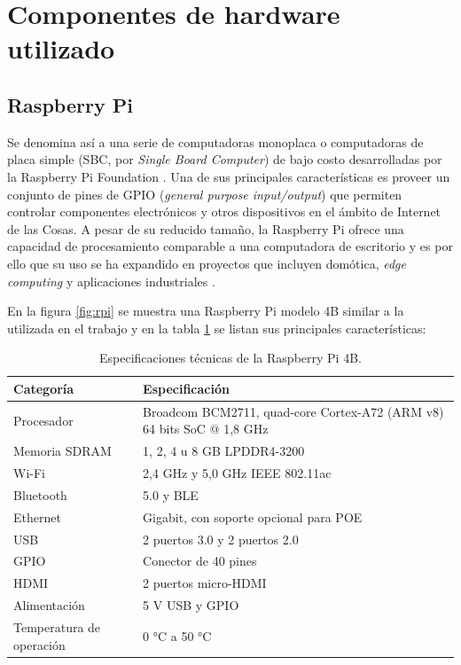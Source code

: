 \section{Componentes de hardware utilizado}
\label{sec:Hardware utilizado}

\subsection{Raspberry Pi}
\label{sec:Raspberry Pi}
Se denomina así a una serie de computadoras monoplaca o computadoras de placa simple (SBC, por \textit{Single Board Computer}) de bajo costo desarrolladas por la Raspberry Pi Foundation \citep{raspberrypi:1}.
Una de sus principales características es proveer un conjunto de pines de GPIO (\textit{general purpose input/output}) que permiten controlar componentes electrónicos y otros dispositivos en el ámbito de Internet de las Cosas.
A pesar de su reducido tamaño, la Raspberry Pi ofrece una capacidad de procesamiento comparable a una computadora de escritorio y es por ello que su uso se ha expandido en proyectos que incluyen domótica, \textit{edge computing} y aplicaciones industriales \citep{raspberrypi:2}. 

En la figura \ref{fig:rpi} se muestra una Raspberry Pi modelo 4B similar a la utilizada en el trabajo y en la tabla \ref{tab:raspberrypi} se listan sus principales características: 
 
\begin{table}[h]
\centering
\caption[Especificaciones técnicas de la Raspberry Pi 4B]{Especificaciones técnicas de la Raspberry Pi 4B.}

\begin{tabular}{p{2.5cm} p{7.5cm} } 
\toprule
\textbf{Categoría} & \textbf{Especificación}\citep{rpi4b}\\

\midrule
Procesador	& Broadcom BCM2711, quad-core Cortex-A72 (ARM v8) 64 bits SoC @ 1,8 GHz \\
Memoria SDRAM	 & 1, 2, 4 u 8 GB LPDDR4-3200 \\
Wi-Fi	& 2,4 GHz y 5,0 GHz IEEE 802.11ac \\
Bluetooth	&  5.0 y BLE \\
Ethernet	& Gigabit, con soporte opcional para POE\\
USB	& 2 puertos  3.0 y 2 puertos 2.0\\
GPIO	&	Conector de 40 pines\\
HDMI	&  2 puertos micro-HDMI\\
Alimentación	& 5 V USB y GPIO\\
Temperatura de operación	& 0 °C a 50 °C \\
\bottomrule
\hline
\end{tabular}
\label{tab:raspberrypi}
\end{table}
 
